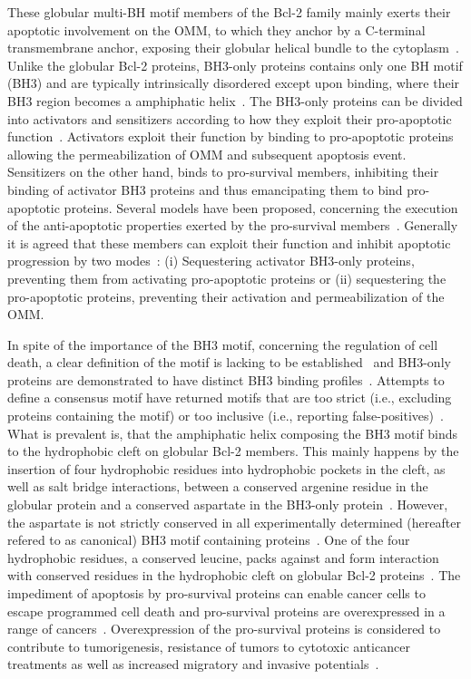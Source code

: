\documentclass[10pt,letterpaper]{article}
\begin{document}
These globular multi-BH motif members of the Bcl-2 family mainly exerts their apoptotic involvement on the OMM, to which they anchor by a C-terminal transmembrane anchor, exposing their globular helical bundle to the cytoplasm~\cite{Hardwick2013}.
Unlike the globular Bcl-2 proteins, BH3-only proteins contains only one BH motif (BH3) and are typically intrinsically disordered except upon binding, where their BH3 region becomes a amphiphatic helix~\cite{Hinds2007}. The BH3-only proteins can be divided into activators and sensitizers according to how they exploit their pro-apoptotic function~\cite{Letai2002, Kuwana2005}. Activators exploit their function by binding to pro-apoptotic proteins allowing the permeabilization of OMM and subsequent apoptosis event. Sensitizers on the other hand, binds to pro-survival members, inhibiting their binding of activator BH3 proteins and thus emancipating them to bind pro-apoptotic proteins. 
Several models have been proposed, concerning the execution of the anti-apoptotic properties exerted by the pro-survival members~\cite{Shamas-din2016}. Generally it is agreed that these members can exploit their function and inhibit apoptotic progression by two modes~\cite{Llambi2011}: (i) Sequestering activator BH3-only proteins, preventing them from activating pro-apoptotic proteins or (ii) sequestering the pro-apoptotic proteins, preventing their activation and permeabilization of the OMM.

In spite of the importance of the BH3 motif, concerning the regulation of cell death, a clear definition of the motif is lacking to be established~\cite{Aouacheria2013, DeBartolo2014, Aouacheria2015} and BH3-only proteins are demonstrated to have distinct BH3 binding profiles~\cite{Chen2005}. Attempts to define a consensus motif have returned motifs that are too strict (i.e., excluding proteins containing the motif) or too inclusive (i.e., reporting false-positives)~\cite{Aouacheria2013}. What is prevalent is, that the amphiphatic helix composing the BH3 motif binds to the hydrophobic cleft on globular Bcl-2 members. This mainly happens by the insertion of four hydrophobic residues into hydrophobic pockets in the cleft, as well as salt bridge interactions, between a conserved argenine residue in the globular protein and a conserved aspartate in the BH3-only protein~\cite{Hinds2005,Czabotar2007, Sattler2010}. However, the aspartate is not strictly conserved in all experimentally determined (hereafter refered to as canonical) BH3 motif containing proteins~\cite{Day2008}. One of the four hydrophobic residues, a conserved leucine, packs against and form interaction with conserved residues in the hydrophobic cleft on globular Bcl-2 proteins~\cite{Hinds2005}.
The impediment of apoptosis by pro-survival proteins can enable cancer cells to escape programmed cell death and pro-survival proteins are overexpressed in a range of cancers~\cite{Rochaix1999, Strik1999, 10.2307/1693640, Placzek2010}. Overexpression of the pro-survival proteins is considered to contribute to tumorigenesis, resistance of tumors to cytotoxic anticancer treatments as well as increased migratory and invasive potentials~\cite{Bae2006, Adams2007, Kim2012}. 
\end{document}

